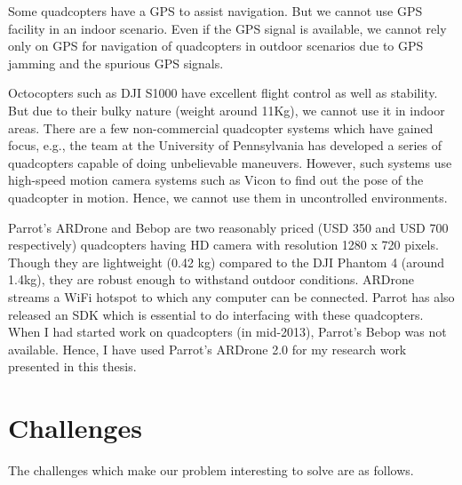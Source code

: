 Some quadcopters have a GPS to assist navigation. But we cannot use
GPS facility in an indoor scenario. Even if the GPS signal is
available, we cannot rely only on GPS for navigation of quadcopters in
outdoor scenarios due to GPS jamming and the spurious GPS signals.

Octocopters such as DJI S1000 have excellent flight control as well as
stability. But due to their bulky nature (weight around 11Kg), we
cannot use it in indoor areas. There are a few non-commercial
quadcopter systems which have gained focus, e.g., the team at the
University of Pennsylvania has developed a series of quadcopters
capable of doing unbelievable maneuvers. However, such systems use
high-speed motion camera systems such as Vicon to find out the pose of
the quadcopter in motion. Hence, we cannot use them in uncontrolled
environments.

Parrot's ARDrone and Bebop are two reasonably priced (USD 350 and USD
700 respectively) quadcopters having HD camera with resolution 1280 x 720
pixels. Though they are lightweight (0.42 kg) compared to the DJI Phantom 4
(around 1.4kg), they are robust enough to withstand outdoor conditions. ARDrone
streams a WiFi hotspot to which any computer can be connected. Parrot has also
released an SDK which is essential to do interfacing with these quadcopters.
When I had started work on quadcopters (in mid-2013), Parrot's Bebop was not
available. Hence, I have used Parrot's ARDrone 2.0 for my research work
presented in this thesis.

\section*{Challenges}
\label{sec:challenges}
The challenges which make our problem interesting to solve are as follows.

